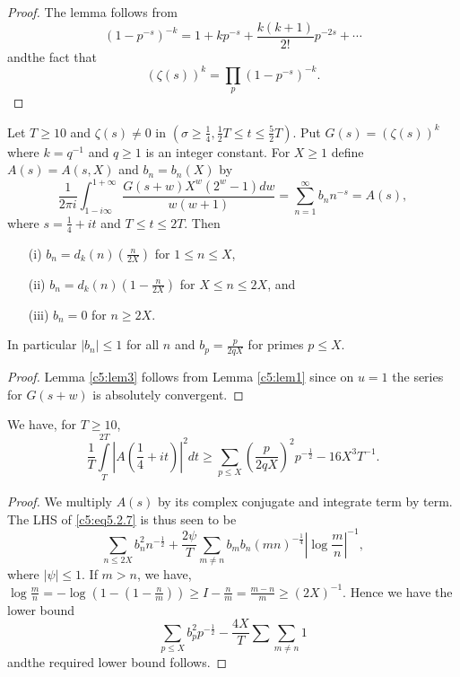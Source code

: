 \begin{proof}
The lemma follows from
$$
(1-p^{-s})^{-k}=1+kp^{-s}+\frac{k(k+1)}{2!}p^{-2s}+\cdots
$$
and\pageoriginale the fact that
$$
(\zeta(s))^{k}=\prod_{p}(1-p^{-s})^{-k}.
$$
\end{proof}

\begin{lem}\label{c5:lem3}
Let $T\geq 10$ and $\zeta(s)\neq 0$ in $(\sigma\geq
\frac{1}{4},\frac{1}{2}T\leq t\leq \frac{5}{2}T)$. Put
$G(s)=(\zeta(s))^{k}$ where $k=q^{-1}$ and $q\geq 1$ is an integer
constant. For $X\geq 1$ define $A(s)=A(s,X)$ and $b_{n}=b_{n}(X)$ by
\begin{equation*}
\frac{1}{2\pi
  i}\int^{1+\infty}_{1-i\infty}\frac{G(s+w)X^{w}(2^{w}-1)dw}{w(w+1)}=\sum^{\infty}_{n=1}b_{n}n^{-s}=A(s),\tag{5.2.6}\label{c5:eq5.2.6} 
\end{equation*}
where $s=\frac{1}{4}+it$ and $T\leq t\leq 2T$. Then
\begin{itemize}
\item[\rm(i)] $b_{n}=d_{k}(n)(\frac{n}{2X})$ for $1\leq n\leq X$,

\item[\rm(ii)] $b_{n}=d_{k}(n)(1-\frac{n}{2X})$ for $X\leq n\leq 2X$, and

\item[\rm(iii)] $b_{n}=0$ for $n\geq 2X$.
\end{itemize}

In particular $|b_{n}|\leq 1$ for all $n$ and $b_{p}=\frac{p}{2qX}$
for primes $p\leq X$.
\end{lem}

\begin{proof}
Lemma \ref{c5:lem3} follows from Lemma \ref{c5:lem1} since on
$u=1$ the series for $G(s+w)$ is absolutely convergent.
\end{proof}

\begin{lem}\label{c5:lem4}
We have, for $T\geq 10$,
\begin{equation*}
\frac{1}{T}\int\limits^{2T}_{T}|A\left(\frac{1}{4}+it\right)|^{2}dt\geq
\sum_{p\leq X}\left(\frac{p}{2qX}\right)^{2}p^{-\frac{1}{2}}-16X^{3}T^{-1}.\tag{5.2.7}\label{c5:eq5.2.7}  
\end{equation*}
\end{lem}

\begin{proof}
We multiply $A(s)$ by its complex conjugate and integrate term by
term. The LHS of \eqref{c5:eq5.2.7} is thus seen to be
$$
\sum_{n\leq
  2X}b^{2}_{n}n^{-\frac{1}{2}}+\frac{2\psi}{T}\sum_{m\neq
  n}b_{m}b_{n}(mn)^{-\frac{1}{4}}|\log\frac{m}{n}|^{-1}, 
$$
where $|\psi|\leq 1$. If $m>n$, we have, $\log \frac{m}{n}=-\log
(1-(1-\frac{n}{m}))\geq I-\frac{n}{m}=\frac{m-n}{m}\geq
(2X)^{-1}$. Hence we have the lower bound
$$
\sum_{p\leq X}b^{2}_{p}p^{-\frac{1}{2}}-\frac{4X}{T}\sum\sum_{m\neq n}1
$$
and\pageoriginale the required lower bound follows.
\end{proof}

